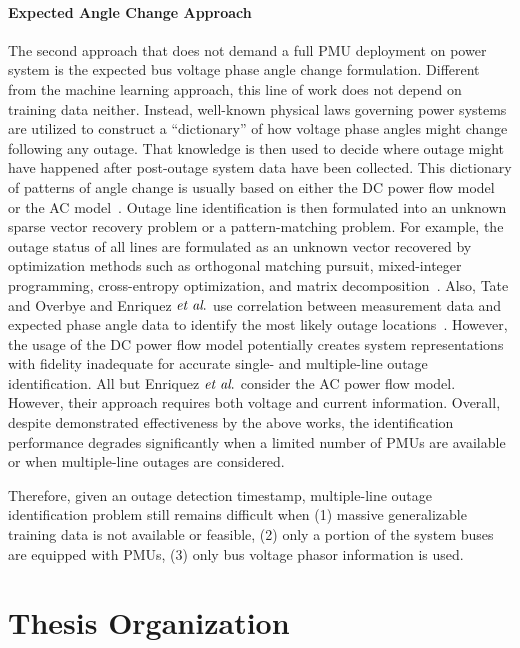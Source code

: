 \paragraph{Expected Angle Change Approach}
The second approach that does not demand a full PMU deployment on power system is the expected bus voltage phase angle change formulation. Different from the machine learning approach, this line of work does not depend on training data neither. Instead, well-known physical laws governing power systems are utilized to construct a ``dictionary'' of how voltage phase angles might change following any outage. That knowledge is then used to decide where outage might have happened after post-outage system data have been collected.
This dictionary of patterns of angle change is usually based on either the DC power flow model~\cite{Tate2008,tate2009double,Zhu2012,Emami2013,Chen2014,Wu2015} or the AC model~\cite{Costilla-Enriquez2019}. Outage line identification is then formulated into an unknown sparse vector recovery problem or a pattern-matching problem. For example, the outage status of all lines are formulated as an unknown vector recovered by optimization methods such as orthogonal matching pursuit, mixed-integer programming, cross-entropy optimization, and matrix decomposition~\cite{Zhu2012, Emami2013,Chen2014,Wu2015}. Also, Tate and Overbye and Enriquez $\textit{et al}.$ use correlation between measurement data and expected phase angle data to identify the most likely outage locations~\cite{Tate2008,Costilla-Enriquez2019}. 
However, the usage of the DC power flow model potentially creates system representations with fidelity inadequate for accurate single- and multiple-line outage identification. All but Enriquez $\textit{et al}.$ consider the AC power flow model. However, their approach requires both voltage and current information. Overall, despite demonstrated effectiveness by the above works, the identification performance degrades significantly when a limited number of PMUs are available or when multiple-line outages are considered. 


Therefore, given an outage detection timestamp, multiple-line outage identification problem still remains difficult when (1) massive generalizable training data is not available or feasible, (2) only a portion of the system buses are equipped with PMUs, (3) only bus voltage phasor information is used.  


\section{Thesis Organization}

